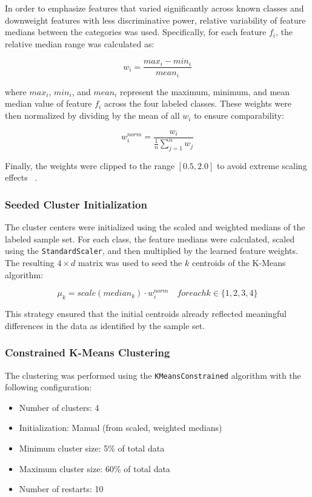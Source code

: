 \documentclass[a4paper,12pt,twoside]{scrreprt}
\begin{document}
In order to emphasize features that varied significantly across known classes
and downweight features with less discriminative power, relative variability of
feature medians between the categories was used. Specifically, for each feature
$f_i$, the relative median range was calculated as:

\[
  w_i = \frac{max_i - min_i}{mean_i}
\]

where $max_i$, $min_i$, and $mean_i$ represent the
maximum, minimum, and mean median value of feature $f_i$ across the four
labeled classes. These weights were then normalized by dividing by the mean of
all $w_i$ to ensure comparability:

\[
  w_i^{norm} = \frac{w_i}{\frac{1}{n}\sum_{j=1}^n w_j}
\]

Finally, the weights were clipped to the range $[0.5, 2.0]$ to avoid extreme
scaling effects ~\cite{guyon_introduction_nodate}.

\subsubsection{Seeded Cluster Initialization}

The cluster centers were initialized using the scaled and weighted medians of
the labeled sample set. For each class, the feature medians were calculated,
scaled using the \texttt{StandardScaler}, and then multiplied by the learned
feature weights. The resulting $4 \times d$ matrix was used to seed the $k$
centroids of the K-Means algorithm:

\[
  \mu_k = scale(median_k) \cdot w_i^{norm}
  \quad for each k \in \{1, 2, 3, 4\}
\]

This strategy ensured that the initial centroids already reflected meaningful
differences in the data as identified by the sample set.

\subsubsection{Constrained K-Means Clustering}

The clustering was performed using the \texttt{KMeansConstrained} algorithm
with the following configuration:

\begin{itemize}
  \item Number of clusters: 4
  \item Initialization: Manual (from scaled, weighted medians)
  \item Minimum cluster size: 5\% of total data
  \item Maximum cluster size: 60\% of total data
  \item Number of restarts: 10
\end{itemize}
\end{document}
